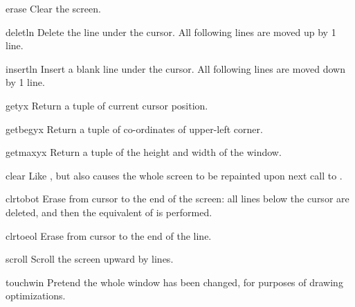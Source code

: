 \begin{methoddesc}{erase}{}
Clear the screen.
\end{methoddesc}

\begin{methoddesc}{deletln}{}
Delete the line under the cursor. All following lines are moved up
by 1 line.
\end{methoddesc}

\begin{methoddesc}{insertln}{}
Insert a blank line under the cursor. All following lines are moved
down by 1 line.
\end{methoddesc}

\begin{methoddesc}{getyx}{}
Return a tuple  of current cursor position.
\end{methoddesc}

\begin{methoddesc}{getbegyx}{}
Return a tuple  of co-ordinates of upper-left
corner.
\end{methoddesc}

\begin{methoddesc}{getmaxyx}{}
Return a tuple  of the height and width of
the window.
\end{methoddesc}

\begin{methoddesc}{clear}{}
Like , but also causes the whole screen to be repainted
upon next call to .
\end{methoddesc}

\begin{methoddesc}{clrtobot}{}
Erase from cursor to the end of the screen: all lines below the cursor
are deleted, and then the equivalent of  is performed.
\end{methoddesc}

\begin{methoddesc}{clrtoeol}{}
Erase from cursor to the end of the line.
\end{methoddesc}

\begin{methoddesc}{scroll}{}
Scroll the screen upward by  lines.
\end{methoddesc}

\begin{methoddesc}{touchwin}{}
Pretend the whole window has been changed, for purposes of drawing
optimizations.
\end{methoddesc}

